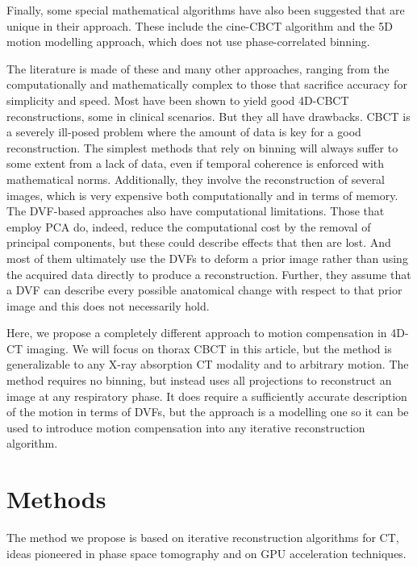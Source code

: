 Finally, some special mathematical algorithms have also been suggested that are unique in their approach.  These include the cine-CBCT algorithm\cite{6803058} and the 5D motion modelling approach\cite{0266-5611-31-11-115007}, which does not use phase-correlated binning.

The literature is made of these and many other approaches, ranging from the computationally and mathematically complex to those that sacrifice accuracy for simplicity and speed.  Most have been shown to yield good 4D-CBCT reconstructions, some in clinical scenarios.  But they all have drawbacks.  CBCT is a severely ill-posed problem where the amount of data is key for a good reconstruction.  The simplest methods that rely on binning will always suffer to some extent from a lack of data, even if temporal coherence is enforced with mathematical norms.  Additionally, they involve the reconstruction of several images, which is very expensive both computationally and in terms of memory.  The DVF-based approaches also have computational limitations.  Those that employ PCA do, indeed, reduce the computational cost by the removal of principal components, but these could describe effects that then are lost.  And most of them ultimately use the DVFs to deform a prior image rather than using the acquired data directly to produce a reconstruction.  Further, they assume that a DVF can describe every possible anatomical change with respect to that prior image and this does not necessarily hold.

Here, we propose a completely different approach to motion compensation in 4D-CT imaging.  We will focus on thorax CBCT in this article, but the method is generalizable to any X-ray absorption CT modality and to arbitrary motion.  The method requires no binning, but instead uses all projections to reconstruct an image at any respiratory phase.  It does require a sufficiently accurate description of the motion in terms of DVFs, but the approach is a modelling one so it can be used to introduce motion compensation into any iterative reconstruction algorithm. 





\section{Methods}

The method we propose is based on iterative reconstruction algorithms for CT, ideas pioneered in phase space tomography and on GPU acceleration techniques. 




